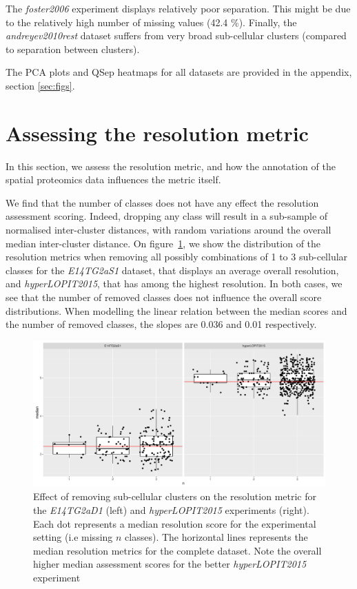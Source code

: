 \documentclass[12pt]{article}\usepackage[]{graphicx}\usepackage[]{color}
\begin{document}
The \textit{foster2006} experiment displays relatively poor
separation. This might be due to the relatively high number of missing
values (42.4 \%). Finally, the \textit{andreyev2010rest} dataset suffers from
very broad sub-cellular clusters (compared to separation between
clusters).


\bigskip

The PCA plots and QSep heatmaps for all datasets are provided in the
appendix, section \ref{sec:figs}.










\section{Assessing the resolution metric}\label{sec:qsepassess}

In this section, we assess the resolution metric, and how the
annotation of the spatial proteomics data influences the metric
itself.



We find that the number of classes does not have any effect the
resolution assessment scoring. Indeed, dropping any class will result
in a sub-sample of normalised inter-cluster distances, with random
variations around the overall median inter-cluster distance. On
figure~\ref{fig:simn}, we show the distribution of the resolution
metrics when removing all possibly combinations of 1 to 3 sub-cellular
classes for the \textit{E14TG2aS1} dataset, that displays an average
overall resolution, and \textit{hyperLOPIT2015}, that has among the
highest resolution. In both cases, we see that the number of removed
classes does not influence the overall score distributions. When
modelling the linear relation between the median scores and the number
of removed classes, the slopes are 0.036 and
0.01 respectively.

\begin{figure}[h]
  \centering
  \includegraphics[width = .7\textwidth]{simn.pdf}
  \caption{Effect of removing sub-cellular clusters on the resolution
    metric for the \textit{E14TG2aD1} (left) and
    \textit{hyperLOPIT2015} experiments (right). Each dot represents a
    median resolution score for the experimental setting (i.e missing
    $n$ classes). The horizontal lines represents the median resolution
    metrics for the complete dataset. Note the overall higher median
    assessment scores for the better \textit{hyperLOPIT2015}
    experiment }
  \label{fig:simn}
\end{figure}
\end{document}
